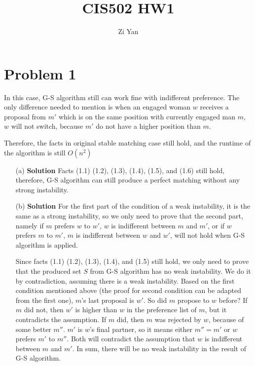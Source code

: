 \documentclass[12pt,letterpaper]{article}
\author{Zi Yan}
\title{CIS502 HW1}
\begin{document}
\maketitle

\section*{Problem 1}
In this case, G-S algorithm still can work fine with indifferent preference. 
The only difference needed to mention is when an engaged woman $w$ receives a 
proposal from $m'$ which is on the same position with currently engaged man $m$, 
$w$ will not switch, because $m'$ do not have a higher position than $m$.

Therefore, the facts in original stable matching case still hold, and the 
runtime of the algorithm is still $O(n^2)$
\begin{itemize}
    \item[(a)] \textbf{Solution} Facts (1.1) (1.2), (1.3), (1.4), (1.5), and (1.6) still 
    hold, therefore, G-S algorithm can still produce a perfect matching without
    any strong instability.
    
    \item[(b)] \textbf{Solution} For the first part of the condition of a weak
    instability, it is the same as a strong instability, so we only need to prove
    that the second part, namely if $m$ prefers $w$ to $w'$, $w$ is indifferent
    between $m$ and $m'$, or if $w$ prefers $m$ to $m'$, $m$ is indifferent
    between $w$ and $w'$, will not hold when G-S algorithm is applied. 
    
    Since facts (1.1) (1.2), (1.3), (1.4), and (1.5) still hold, we only need to prove
    that the produced set $S$ from G-S algorithm has no weak instability. We do
    it by contradiction, assuming there is a weak instability. Based on the first 
    condition mentioned above (the proof for second condition can be adapted 
    from the first one), $m$'s last proposal is $w'$. So did $m$ propose to 
    $w$ before? If $m$ did not, then $w'$ is higher than $w$ in the preference 
    list of $m$, but it contradicts the assumption. If $m$ did, then $m$ was 
    rejected by $w$, because of some better $m''$. $m'$ is $w$'s final partner,
    so it means either $m'' = m'$ or $w$ prefers $m'$ to $m''$. Both will 
    contradict the assumption that $w$ is indifferent between $m$ and $m'$.
    In sum, there will be no weak instability in the result of G-S algorithm.    
\end{itemize}
\end{document}
